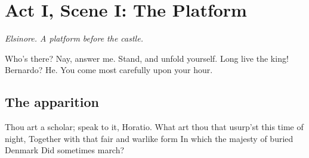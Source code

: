 \section*{Act I, Scene I: The Platform}
\emph{Elsinore. A platform before the castle.}

 Who's there?
 Nay, answer me. Stand, and unfold yourself.
 Long live the king!
 Bernardo?
 He.
 You come most carefully upon your hour.

\subsection*{The apparition}
 Thou art a scholar; speak to it, Horatio.
 What art thou that usurp'st this time of night,
Together with that fair and warlike form
In which the majesty of buried Denmark
Did sometimes march?
